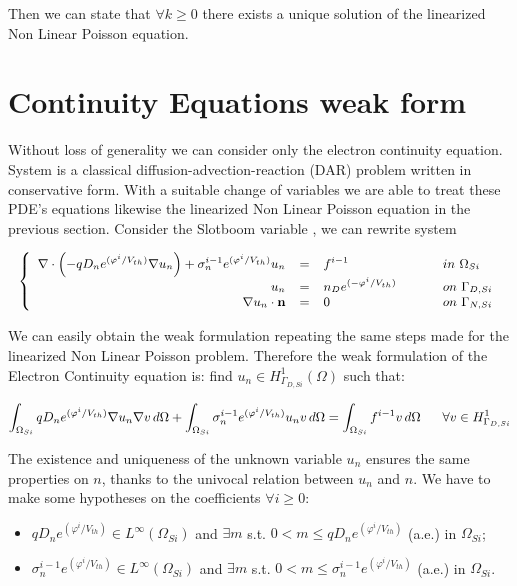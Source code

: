 Then we can state that $\forall k \geq 0$ there exists a unique solution of the linearized Non Linear Poisson equation.

\section{Continuity Equations weak form}

Without loss of generality we can consider only the electron continuity equation. System  is a classical diffusion-advection-reaction (DAR) problem written in conservative form. With a suitable change of variables we are able to treat these PDE's equations likewise the linearized Non Linear Poisson equation in the previous section. Consider the Slotboom variable , we can rewrite system 

\begin{equation}
\small
\left\{
\begin{array}{rcll}
 \nabla \cdot \left( - q D_n e^{(\varphi^{i}/V_{th})}\nabla u_n \right) + \sigma_n^{i-1} e^{(\varphi^{i}/V_{th})} u_n& = & f^{i-1}  & \psp{15} in \psp{2} \Omega_{Si} \\
u_n & = &  n_D e^{(-\varphi^{i}/V_{th})} & \psp{15} on \psp{2} \Gamma_{D,Si} \\
\nabla u_n \cdot \vect{n} & = & 0 & \psp{15} on \psp{2} \Gamma_{N,Si}
\end{array}
\right.
\end{equation}

We can easily obtain the weak formulation repeating the same steps made for the linearized Non Linear Poisson problem. Therefore the weak formulation of the Electron Continuity equation is: find $u_n \in H^1_{\Gamma_{D,Si}}(\Omega)$ such that:

\begin{equation}
\small
\label{eq: LEC weakformulation}
\int_{\Omega_{Si}}  q D_n e^{(\varphi^{i}/V_{th})} \nabla u_n \nabla v \, d\Omega + \int_{\Omega_{Si}} \sigma_n^{i-1} e^{(\varphi^{i}/V_{th})} u_n v \, d\Omega = \int_{\Omega_{Si}} f^{i-1}v \, d\Omega \psp{10} \forall v \in H^1_{\Gamma_{D,Si}}
\end{equation}


The existence and uniqueness of the unknown variable $u_n$ ensures the same properties on $n$, thanks to the univocal relation between $u_n$ and $n$.
We have to make some hypotheses on the coefficients $\forall i\geq 0$:
\begin{itemize}
\item $q D_n e^{(\varphi^{i}/V_{th})} \in L^{\infty}(\Omega_{Si})$ and $\exists m$ s.t. $0 < m \leq q D_n e^{(\varphi^{i}/V_{th})}$ (a.e.) in $\Omega_{Si}$;
\item  $\sigma_n^{i-1} e^{(\varphi^{i}/V_{th})} \in L^{\infty}(\Omega_{Si})$ and $\exists m$ s.t. $0 < m \leq \sigma_n^{i-1} e^{(\varphi^{i}/V_{th})}$ (a.e.) in $\Omega_{Si}$.
\end{itemize}

